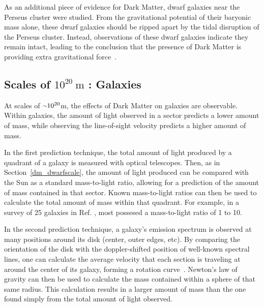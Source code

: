     As an additional piece of evidence for Dark Matter, dwarf galaxies near the Perseus cluster were studied.
    From the gravitational potential of their baryonic mass alone, these dwarf galaxies should be ripped apart by the tidal disruption of the Perseus cluster.
    Instead, observations of these dwarf galaxies indicate they remain intact, leading to the conclusion that the presence of Dark Matter is providing extra gravitational force~\cite{Penny2009}.
    
    \FloatBarrier

  \subsection{Scales of $10^{20}\:\text{m}$ : Galaxies}\label{dm_gal}
    At scales of $\nicetilde 10^{20}$m, the effects of Dark Matter on galaxies are observable.
    Within galaxies, the amount of light observed in a sector predicts a lower amount of mass, while observing the line-of-sight velocity predicts a higher amount of mass.
    
    In the first prediction technique, the total amount of light produced by a quadrant of a galaxy is measured with optical telescopes.
    Then, as in Section~\ref{dm_dwarfscale}, the amount of light produced can be compared with the Sun as a standard mass-to-light ratio, allowing for a prediction of the amount of mass contained in that sector.
    Known mass-to-light ratios can then be used to calculate the total amount of mass within that quadrant.
    For example, in a survey of 25 galaxies in Ref. \cite{galaxy_mass_light_ratio}, most possesed a mass-to-light ratio of 1 to 10.

    In the second prediction technique, a galaxy's emission spectrum is observed at many positions around its disk (center, outer edges, etc).
    By comparing the orientation of the disk with the doppler-shifted position of well-known spectral lines, one can calculate the average velocity that each section is traveling at around the center of its galaxy, forming a rotation curve~\cite{rotation_curve_review,spiral_galaxy_rot_curve,milkyway_dm_evidence}.
    Newton's law of gravity can then be used to calculate the mass contained within a sphere of that same radius.
    This calculation results in a larger amount of mass than the one found simply from the total amount of light observed.
    
